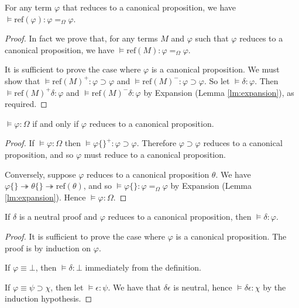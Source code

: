 \documentclass[a4paper,UKenglish]{lipics-v2016}
\newcommand*{\reff}[1]{\ensuremath{\mathrm{ref} \left( {#1} \right)}}
\theoremstyle{plain}
\theoremstyle{definition}
\begin{document}
\begin{lemma}
\label{lm:ref-compute-Omega}
For any term $\varphi$ that reduces to a canonical proposition, we have $\models \reff{\varphi} : \varphi =_\Omega \varphi$.
\end{lemma}

\begin{proof}
In fact we prove that, for any terms $M$ and $\varphi$ such that $\varphi$ reduces to a canonical proposition, we have
$\models \reff{M} : \varphi =_\Omega \varphi$.

It is sufficient to prove the case where $\varphi$ is a canonical proposition.
We must show that $\models \reff{M}^+ : \varphi \supset \varphi$ and $\models \reff{M}^- : \varphi \supset \varphi$.  So let $\models \delta : \varphi$.
Then $\models \reff{M}^+ \delta : \varphi$ and $\models \reff{M}^- \delta : \varphi$ by Expansion (Lemma \ref{lm:expansion}), as required.
\end{proof}

\begin{lemma}
$\models \varphi : \Omega$ if and only if $\varphi$ reduces to a canonical proposition.
\end{lemma}

\begin{proof}
If $\models \varphi : \Omega$ then $\models \varphi \{\}^+ : \varphi \supset \varphi$.  Therefore $\varphi \supset \varphi$ reduces to a canonical proposition,
and so $\varphi$ must reduce to a canonical proposition.

Conversely, suppose $\varphi$ reduces to a canonical proposition $\theta$.  We have $\varphi \{\} \twoheadrightarrow \theta \{\} \twoheadrightarrow \reff{\theta}$, and so $\models \varphi \{\} : \varphi =_\Omega \varphi$ by Expansion (Lemma \ref{lm:expansion}).  Hence $\models \varphi : \Omega$.
\end{proof}

\begin{lemma}
\label{lm:neutral-proof}
If $\delta$ is a neutral proof and $\varphi$ reduces to a canonical proposition, then $\models \delta : \varphi$.
\end{lemma}

\begin{proof}
It is sufficient to prove the case where $\varphi$ is a canonical proposition.  The proof is by induction on $\varphi$.

If $\varphi \equiv \bot$, then $\models \delta : \bot$ immediately from the definition.

If $\varphi \equiv \psi \supset \chi$, then let $\models \epsilon : \psi$.  We have that $\delta \epsilon$ is neutral,
hence $\models \delta \epsilon : \chi$ by the induction hypothesis.
\end{proof}
\end{document}
